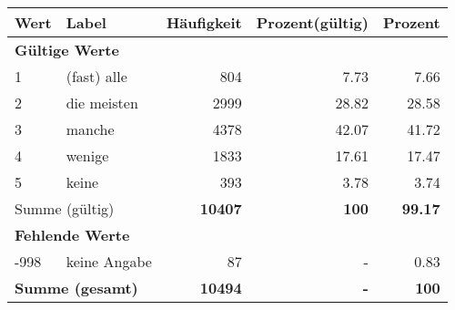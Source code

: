      \begin{longtable}{lXrrr}
     \toprule
     \textbf{Wert} & \textbf{Label} & \textbf{Häufigkeit} & \textbf{Prozent(gültig)} & \textbf{Prozent} \\
     \endhead
     \midrule
     \multicolumn{5}{l}{\textbf{Gültige Werte}}\\

     1 &
     \multicolumn{1}{X}{ (fast) alle   } &


       \num{804} &
       \num[round-mode=places,round-precision=2]{7,73} &
         \num[round-mode=places,round-precision=2]{7,66} \\

     2 &
     \multicolumn{1}{X}{ die meisten   } &


       \num{2999} &
       \num[round-mode=places,round-precision=2]{28,82} &
         \num[round-mode=places,round-precision=2]{28,58} \\

     3 &
     \multicolumn{1}{X}{ manche   } &


       \num{4378} &
       \num[round-mode=places,round-precision=2]{42,07} &
         \num[round-mode=places,round-precision=2]{41,72} \\

     4 &
     \multicolumn{1}{X}{ wenige   } &


       \num{1833} &
       \num[round-mode=places,round-precision=2]{17,61} &
         \num[round-mode=places,round-precision=2]{17,47} \\

     5 &
     \multicolumn{1}{X}{ keine   } &


       \num{393} &
       \num[round-mode=places,round-precision=2]{3,78} &
         \num[round-mode=places,round-precision=2]{3,74} \\
     \midrule
     \multicolumn{2}{l}{Summe (gültig)} &
       \textbf{\num{10407}} &
     \textbf{100} &
       \textbf{\num[round-mode=places,round-precision=2]{99,17}} \\
     \multicolumn{5}{l}{\textbf{Fehlende Werte}}\\
       -998 &
       keine Angabe &
         \num{87} &
        - &
         \num[round-mode=places,round-precision=2]{0,83} \\
     \midrule
     \multicolumn{2}{l}{\textbf{Summe (gesamt)}} &
          \textbf{\num{10494}} &
        \textbf{-} &
        \textbf{100} \\
     \bottomrule
     \end{longtable}
     
